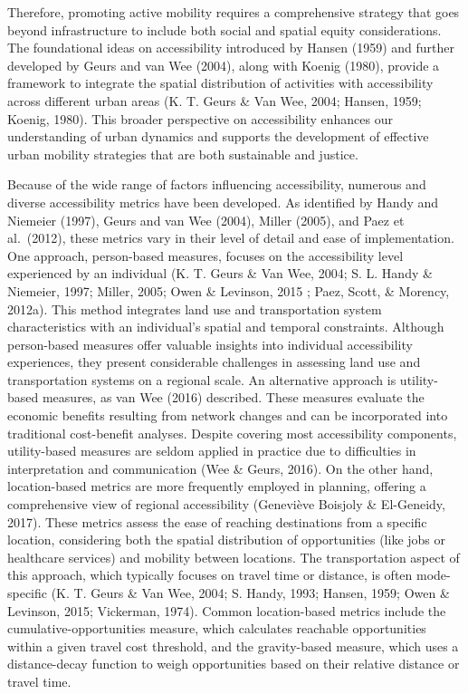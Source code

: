 \documentclass[
11pt, %
oneside, %
english, %
singlespacing, %
]{macthesis} %
\begin{document}
Therefore, promoting active mobility requires a comprehensive strategy that goes beyond infrastructure to include both social and spatial equity considerations. The foundational ideas on accessibility introduced by Hansen (1959) and further developed by Geurs and van Wee (2004), along with Koenig (1980), provide a framework to integrate the spatial distribution of activities with accessibility across different urban areas (K. T. Geurs \& Van Wee, 2004; Hansen, 1959; Koenig, 1980). This broader perspective on accessibility enhances our understanding of urban dynamics and supports the development of effective urban mobility strategies that are both sustainable and justice.

Because of the wide range of factors influencing accessibility, numerous and diverse accessibility metrics have been developed. As identified by Handy and Niemeier (1997), Geurs and van Wee (2004), Miller (2005), and Paez et al.~(2012), these metrics vary in their level of detail and ease of implementation. One approach, person-based measures, focuses on the accessibility level experienced by an individual (K. T. Geurs \& Van Wee, 2004; S. L. Handy \& Niemeier, 1997; Miller, 2005; Owen \& Levinson, 2015 ; Paez, Scott, \& Morency, 2012a). This method integrates land use and transportation system characteristics with an individual's spatial and temporal constraints. Although person-based measures offer valuable insights into individual accessibility experiences, they present considerable challenges in assessing land use and transportation systems on a regional scale. An alternative approach is utility-based measures, as van Wee (2016) described. These measures evaluate the economic benefits resulting from network changes and can be incorporated into traditional cost-benefit analyses. Despite covering most accessibility components, utility-based measures are seldom applied in practice due to difficulties in interpretation and communication (Wee \& Geurs, 2016).
On the other hand, location-based metrics are more frequently employed in planning, offering a comprehensive view of regional accessibility (Geneviève Boisjoly \& El-Geneidy, 2017). These metrics assess the ease of reaching destinations from a specific location, considering both the spatial distribution of opportunities (like jobs or healthcare services) and mobility between locations. The transportation aspect of this approach, which typically focuses on travel time or distance, is often mode-specific (K. T. Geurs \& Van Wee, 2004; S. Handy, 1993; Hansen, 1959; Owen \& Levinson, 2015; Vickerman, 1974). Common location-based metrics include the cumulative-opportunities measure, which calculates reachable opportunities within a given travel cost threshold, and the gravity-based measure, which uses a distance-decay function to weigh opportunities based on their relative distance or travel time.
\end{document}
